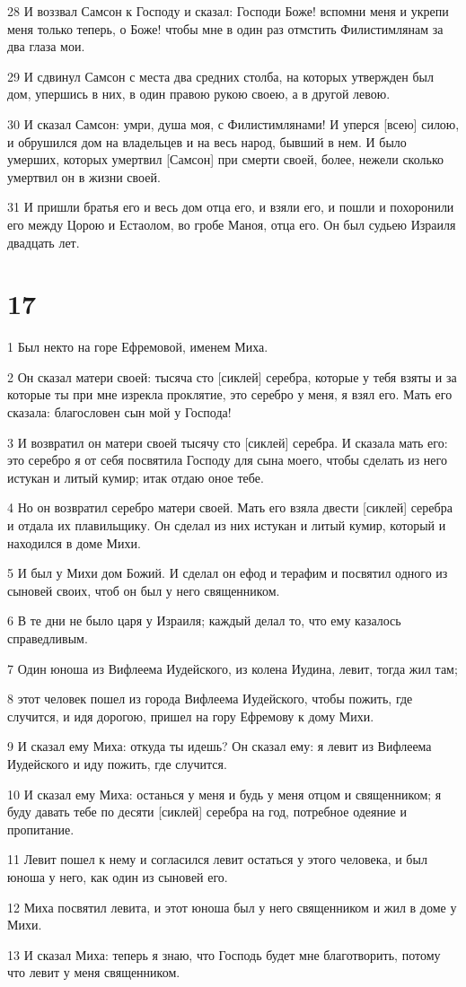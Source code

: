 \par 28 И воззвал Самсон к Господу и сказал: Господи Боже! вспомни меня и укрепи меня только теперь, о Боже! чтобы мне в один раз отмстить Филистимлянам за два глаза мои.
\par 29 И сдвинул Самсон с места два средних столба, на которых утвержден был дом, упершись в них, в один правою рукою своею, а в другой левою.
\par 30 И сказал Самсон: умри, душа моя, с Филистимлянами! И уперся [всею] силою, и обрушился дом на владельцев и на весь народ, бывший в нем. И было умерших, которых умертвил [Самсон] при смерти своей, более, нежели сколько умертвил он в жизни своей.
\par 31 И пришли братья его и весь дом отца его, и взяли его, и пошли и похоронили его между Цорою и Естаолом, во гробе Маноя, отца его. Он был судьею Израиля двадцать лет.

\chapter{17}

\par 1 Был некто на горе Ефремовой, именем Миха.
\par 2 Он сказал матери своей: тысяча сто [сиклей] серебра, которые у тебя взяты и за которые ты при мне изрекла проклятие, это серебро у меня, я взял его. Мать его сказала: благословен сын мой у Господа!
\par 3 И возвратил он матери своей тысячу сто [сиклей] серебра. И сказала мать его: это серебро я от себя посвятила Господу для сына моего, чтобы сделать из него истукан и литый кумир; итак отдаю оное тебе.
\par 4 Но он возвратил серебро матери своей. Мать его взяла двести [сиклей] серебра и отдала их плавильщику. Он сделал из них истукан и литый кумир, который и находился в доме Михи.
\par 5 И был у Михи дом Божий. И сделал он ефод и терафим и посвятил одного из сыновей своих, чтоб он был у него священником.
\par 6 В те дни не было царя у Израиля; каждый делал то, что ему казалось справедливым.
\par 7 Один юноша из Вифлеема Иудейского, из колена Иудина, левит, тогда жил там;
\par 8 этот человек пошел из города Вифлеема Иудейского, чтобы пожить, где случится, и идя дорогою, пришел на гору Ефремову к дому Михи.
\par 9 И сказал ему Миха: откуда ты идешь? Он сказал ему: я левит из Вифлеема Иудейского и иду пожить, где случится.
\par 10 И сказал ему Миха: останься у меня и будь у меня отцом и священником; я буду давать тебе по десяти [сиклей] серебра на год, потребное одеяние и пропитание.
\par 11 Левит пошел к нему и согласился левит остаться у этого человека, и был юноша у него, как один из сыновей его.
\par 12 Миха посвятил левита, и этот юноша был у него священником и жил в доме у Михи.
\par 13 И сказал Миха: теперь я знаю, что Господь будет мне благотворить, потому что левит у меня священником.

